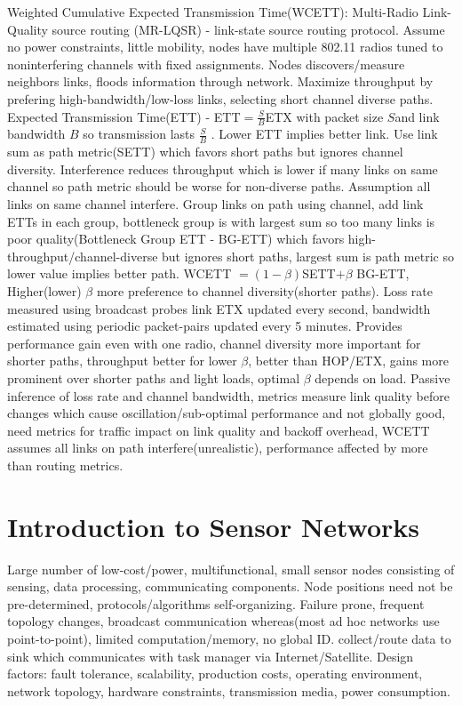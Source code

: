 \documentclass[8pt]{extarticle}
\begin{document}
\begin{multicols}{2}
Weighted Cumulative Expected Transmission Time(WCETT): Multi-Radio Link-Quality source routing (MR-LQSR) - link-state  source routing protocol. Assume no power constraints, little mobility, nodes have multiple 802.11 radios tuned to noninterfering channels with fixed assignments.  Nodes discovers/measure neighbors links, floods information through network. Maximize throughput by prefering high-bandwidth/low-loss links, selecting short channel diverse paths. Expected Transmission Time(ETT) - ETT$=\frac{S}{B}$ETX with packet size $S$and link bandwidth $B$ so transmission lasts $\frac{S}{B}$ . Lower ETT implies better link. Use link sum as path metric(SETT) which favors short paths but ignores channel diversity. Interference reduces throughput which is lower if many links on same channel so path metric should be worse for non-diverse paths. Assumption all links on same channel interfere. Group links on path using channel, add link ETTs in each group, bottleneck group is with largest sum so too many links is poor quality(Bottleneck Group ETT - BG-ETT) which favors high-throughput/channel-diverse but ignores short paths, largest sum is path metric so lower value implies better path. WCETT $=(1-\beta)$SETT$+\beta$ BG-ETT, Higher(lower) $\beta$ more preference to channel diversity(shorter paths). Loss rate measured using broadcast probes link ETX updated every second, bandwidth estimated using periodic packet-pairs updated every 5 minutes. Provides performance gain even with one radio, channel diversity more important for shorter paths, throughput better for lower $\beta$, better than HOP/ETX, gains more prominent over shorter paths and light loads, optimal $\beta$ depends on load. Passive inference of loss rate and channel bandwidth, metrics measure link quality before changes which cause oscillation/sub-optimal performance and not globally good, need metrics for traffic impact on link quality and backoff overhead, WCETT assumes all links on path interfere(unrealistic), performance affected by more than routing metrics.

\section{Introduction to Sensor Networks}

Large number of low-cost/power, multifunctional, small sensor nodes consisting of sensing, data processing, communicating components. Node positions need not be pre-determined, protocols/algorithms self-organizing. Failure prone, frequent topology changes, broadcast communication whereas(most ad hoc networks use point-to-point), limited computation/memory, no global ID. collect/route data to sink which communicates with task manager via Internet/Satellite. Design factors: fault tolerance, scalability, production costs, operating environment, network topology, hardware constraints, transmission media, power consumption.


\end{multicols}
\end{document}
